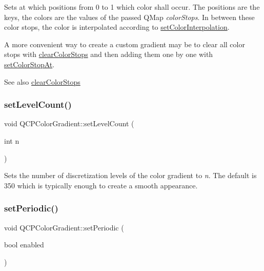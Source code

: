 Sets at which positions from 0 to 1 which color shall occur. The positions are the keys, the colors are the values of the passed Q\+Map {\itshape color\+Stops}. In between these color stops, the color is interpolated according to \hyperlink{class_q_c_p_color_gradient_aa13fda86406e1d896a465a409ae63b38}{set\+Color\+Interpolation}.

A more convenient way to create a custom gradient may be to clear all color stops with \hyperlink{class_q_c_p_color_gradient_a939213e85f0d1279519d555c5fcfb6ad}{clear\+Color\+Stops} and then adding them one by one with \hyperlink{class_q_c_p_color_gradient_a3b48be5e78079db1bb2a1188a4c3390e}{set\+Color\+Stop\+At}.

\begin{DoxySeeAlso}{See also}
\hyperlink{class_q_c_p_color_gradient_a939213e85f0d1279519d555c5fcfb6ad}{clear\+Color\+Stops} 
\end{DoxySeeAlso}
\hypertarget{class_q_c_p_color_gradient_a18da587eb4f7fc788ea28ba15b6a12de}{}\label{class_q_c_p_color_gradient_a18da587eb4f7fc788ea28ba15b6a12de} 
\subsubsection{\texorpdfstring{set\+Level\+Count()}{setLevelCount()}}
{\footnotesize\ttfamily void Q\+C\+P\+Color\+Gradient\+::set\+Level\+Count (\begin{DoxyParamCaption}\item[{int}]{n }\end{DoxyParamCaption})}

Sets the number of discretization levels of the color gradient to {\itshape n}. The default is 350 which is typically enough to create a smooth appearance.

 \hypertarget{class_q_c_p_color_gradient_a39d6448155fc00a219f239220d14bb39}{}\label{class_q_c_p_color_gradient_a39d6448155fc00a219f239220d14bb39} 
\subsubsection{\texorpdfstring{set\+Periodic()}{setPeriodic()}}
{\footnotesize\ttfamily void Q\+C\+P\+Color\+Gradient\+::set\+Periodic (\begin{DoxyParamCaption}\item[{bool}]{enabled }\end{DoxyParamCaption})}

